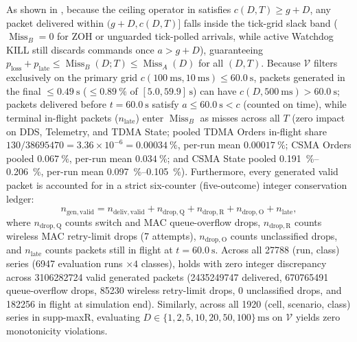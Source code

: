 \documentclass[11pt,a4paper]{article}
\newcommand{\MissA}{\ensuremath{\operatorname{Miss}_A}}
\newcommand{\MissB}{\ensuremath{\operatorname{Miss}_B}}
\newcommand{\ploss}{\ensuremath{p_{\mathrm{loss}}}}
\begin{document}
As shown in , because the ceiling operator in  satisfies $c(D, T) \ge g + D$, any packet delivered within $(g + D, c(D, T)]$ falls inside the tick-grid slack band ($\MissB = 0$ for ZOH or unguarded tick-polled arrivals, while active Watchdog KILL still discards commands once $a > g + D$), guaranteeing $\ploss + p_{\mathrm{late}} \le \MissB(D; T) \le \MissA(D)$ for all $(D, T)$. Because $\mathcal{V}$ filters exclusively on the primary grid $c(\qty{100}{\milli\second}, \qty{10}{\milli\second}) \le \qty{60.0}{\second}$, packets generated in the final $\le \qty{0.49}{\second}$ ($\le \qty{0.89}{\percent}$ of $[5.0, 59.9]\,\text{s}$) can have $c(D, \qty{500}{\milli\second}) > \qty{60.0}{\second}$; packets delivered before $t=\qty{60.0}{\second}$ satisfy $a \le \qty{60.0}{\second} < c$ (counted on time), while terminal in-flight packets ($n_{\mathrm{late}}$) enter $\MissB$ as misses across all $T$ (zero impact on DDS, Telemetry, and TDMA State; pooled TDMA Orders in-flight share $130 / \num{38695470} = 3.36 \times 10^{-6} = \qty{0.00034}{\percent}$, per-run mean $\qty{0.00017}{\percent}$; CSMA Orders pooled $\qty{0.067}{\percent}$, per-run mean $\qty{0.034}{\percent}$; and CSMA State pooled \qtyrange{0.191}{0.206}{\percent}, per-run mean \qtyrange{0.097}{0.105}{\percent}). Furthermore, every generated valid packet is accounted for in a strict six-counter (five-outcome) integer conservation ledger:
\begin{equation}
n_{\mathrm{gen,valid}} = n_{\mathrm{deliv,valid}} + n_{\mathrm{drop,Q}} + n_{\mathrm{drop,R}} + n_{\mathrm{drop,O}} + n_{\mathrm{late}},
\label{eq:conservation}
\end{equation}
where $n_{\mathrm{drop,Q}}$ counts switch and MAC queue-overflow drops, $n_{\mathrm{drop,R}}$ counts wireless MAC retry-limit drops (7 attempts), $n_{\mathrm{drop,O}}$ counts unclassified drops, and $n_{\mathrm{late}}$ counts packets still in flight at $t = \qty{60.0}{\second}$. Across all \num{27788} (run, class) series (\num{6947} evaluation runs $\times 4$ classes),  holds with zero integer discrepancy across \num{3106282724} valid generated packets (\num{2435249747} delivered, \num{670765491} queue-overflow drops, \num{85230} wireless retry-limit drops, \num{0} unclassified drops, and \num{182256} in flight at simulation end). Similarly, across all \num{1920} (cell, scenario, class) series in supp-maxR, evaluating $D \in \{1, 2, 5, 10, 20, 50, 100\}\,\text{ms}$ on $\mathcal{V}$ yields zero monotonicity violations.
\end{document}
